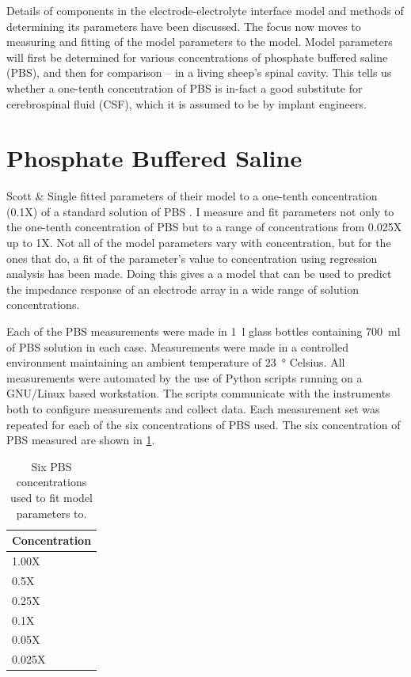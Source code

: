
Details of components in the electrode-electrolyte interface model and methods of determining its parameters have been discussed.
The focus now moves to measuring and fitting of the model parameters to the model.
Model parameters will first be determined for various concentrations of phosphate buffered saline (PBS), and then for comparison -- in a living sheep's spinal cavity.
This tells us whether a one-tenth concentration of PBS is in-fact a good substitute for cerebrospinal fluid (CSF), which it is assumed to be by implant engineers.

\section{Phosphate Buffered Saline}
    Scott \& Single fitted parameters of their model to a one-tenth concentration (0.1X) of a standard solution of PBS \cite{Scott2014}.
    I measure and fit parameters not only to the one-tenth concentration of PBS but to a range of concentrations from 0.025X up to 1X.
    Not all of the model parameters vary with concentration, but for the ones that do, a fit of the parameter's value to concentration using regression analysis has been made. %
    Doing this gives a a model that can be used to predict the impedance response of an electrode array in a wide range of solution concentrations.

    Each of the PBS measurements were made in \SI{1}{\litre} glass bottles containing \SI{700}{\milli\litre} of PBS solution in each case.
    Measurements were made in a controlled environment maintaining an ambient temperature of \SI{23}{\degree} Celsius.
    All measurements were automated by the use of Python scripts running on a GNU/Linux based workstation.
    The scripts communicate with the instruments both to configure measurements and collect data.
    Each measurement set was repeated for each of the six concentrations of PBS used.
    The six concentration of PBS measured are shown in \cref{tab:pt2-PBS_concentrations}.
    \begin{table}
      \centering
      \begin{tabular}{l}
        Concentration\\
        \hline
        1.00X\\
        0.5X\\
        0.25X\\
        0.1X\\
        0.05X\\
        0.025X\\
      \end{tabular}
      \caption{\label{tab:pt2-PBS_concentrations}Six PBS concentrations used to fit model parameters to.}
    \end{table}

